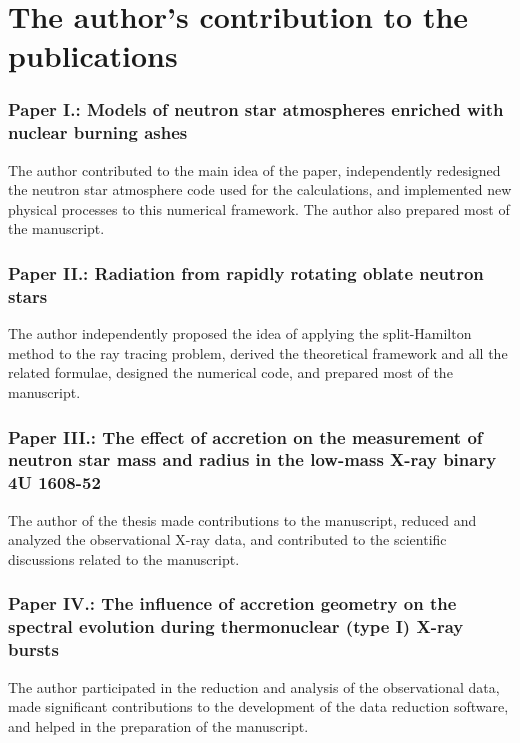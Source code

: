 \section{The author's contribution to the publications} 

\subsubsection*{Paper I.: Models of neutron star atmospheres enriched with nuclear burning ashes}
The author contributed to the main idea of the paper, independently redesigned the neutron star atmosphere code used for the calculations, and implemented new physical processes to this numerical framework. 
The author also prepared most of the manuscript.

\subsubsection*{Paper II.: Radiation from rapidly rotating oblate neutron stars}
The author independently proposed the idea of applying the split-Hamilton method to the ray tracing problem, derived the theoretical framework and all the related formulae, designed the numerical code, and prepared most of the manuscript.

\subsubsection*{Paper III.: The effect of accretion on the measurement of neutron star mass and radius in the low-mass X-ray binary 4U 1608-52}
The author of the thesis made contributions to the manuscript, reduced and analyzed the observational X-ray data, and contributed to the scientific discussions related to the manuscript.

\subsubsection*{Paper IV.: The influence of accretion geometry on the spectral evolution during thermonuclear (type I) X-ray bursts}
The author participated in the reduction and analysis of the observational data, made significant contributions to the development of the data reduction software, and helped in the preparation of the manuscript.

